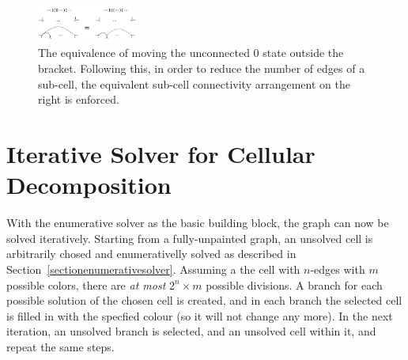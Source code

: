 \documentclass[journal]{IEEEtran}
\begin{document}
\begin{figure}[t]
\centering
\includegraphics[width = 0.3\textwidth]{proof/equiv_zero}
\caption{The equivalence of moving the unconnected $0$ state outside the bracket. Following this, in order to reduce the number of edges of a sub-cell, the equivalent sub-cell connectivity arrangement on the right is enforced.}
\label{figconstraint}
\end{figure} 


\section{Iterative Solver for Cellular Decomposition}
\label{sectioniterativesolver}

With the enumerative solver as the basic building block, the graph can now be solved iteratively.
Starting from a fully-unpainted graph, an unsolved cell is arbitrarily chosed and enumerativelly solved as 
described in Section~\ref{sectionenumerativesolver}. %
Assuming a the cell with $n$-edges with $m$ possible colors, there are \textit{at most} $2^n\times m$ possible divisions. A branch for each possible solution of the chosen cell is created, and in each branch the selected cell is filled in with the specfied colour (so it will not change any more). 
In the next iteration, an unsolved branch is selected, and an unsolved cell within it, and repeat the same steps.
 
\end{document}
